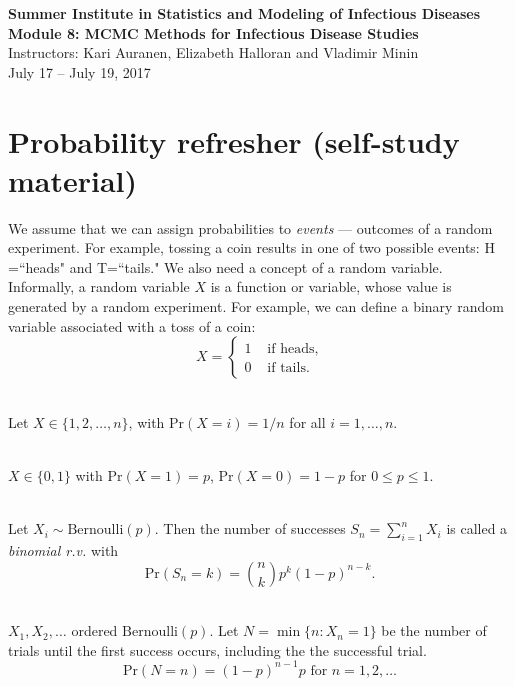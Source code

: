 \documentclass[11pt]{article}\usepackage[]{graphicx}\usepackage[]{color}
\numberwithin{algorithm}{section}
\newcommand{\prob}[1]{\ensuremath{\text{Pr}\left(#1 \right)}}
\theoremstyle{remark}
\theoremstyle{definition}
\newenvironment{example}[1]{\begin{trivlist}
\item[\hskip \labelsep {\bfseries Example}: \underline{#1}]\ \\}{\end{trivlist}}
\begin{document}


\begin{center}
  \textbf{\Large Summer Institute in Statistics and Modeling of Infectious Diseases}\\
  \textbf{\Large Module 8: MCMC Methods for Infectious Disease Studies}\\
  {\large Instructors: Kari Auranen, Elizabeth Halloran and Vladimir Minin}\\
  {\large July 17 -- July 19, 2017}
\end{center}



\section{Probability refresher (self-study material)}


We assume that we can assign probabilities to \textit{events} --- outcomes of a random experiment. For example,
tossing a coin results in one of two possible events: H =``heads" and T=``tails." We also need a concept of a random variable. Informally, a random variable $X$ is a function or variable, whose value is generated by a random experiment. For example, we can define a binary random variable associated with a toss of a coin:
\begin{equation*}
X = 
\begin{cases}
1 &\text{ if heads},\\
0 &\text{ if tails}.
\end{cases}
\end{equation*}

\begin{example}{Discrete uniform random variable}
  Let $X \in \{1,2,\dots,n\}$, with $\prob{X=i} = 1/n$ for all $i = 1,\dots,n$.
\end{example}

\begin{example}{Bernoulli r.v.}
  $X \in \{0,1\}$ with $\prob{X=1}=p$, $\prob{X=0}=1-p$ for $0 \le p \le 1$.
\end{example}

\begin{example}{Binomial r.v.}
  Let $X_i \sim \text{Bernoulli}(p)$. Then the number of successes 
  $S_n = \sum_{i=1}^n X_i$ is called a \textit{binomial r.v.} with 
  \[
  \prob{S_n=k} = {n \choose k} p^k (1-p)^{n-k}.
  \]
\end{example}

\begin{example}{Geometric r.v.}
  $X_1, X_2, \dots$ ordered $\text{Bernoulli}(p)$. Let 
  $N = \min\{n: X_n=1\}$ be the number of trials until the first success occurs, including the 
    the successful trial.
    \[
    \prob{N=n} = (1-p)^{n-1}p  \text{ for } n=1,2,\dots
    \]
\end{example}
\end{document}
